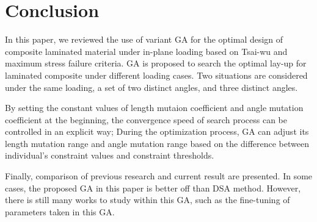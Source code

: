 \section{Conclusion}
In this paper, we reviewed the use of variant GA for the optimal design of composite
laminated material under in-plane loading based on Tsai-wu and maximum stress
failure criteria. GA is proposed to search the optimal lay-up for laminated
composite under different loading cases. Two situations are considered under the same
loading, a set of two distinct angles, and three distinct angles. 

By setting the constant values of length mutaion coefficient and angle mutation
coefficient at the beginning, the convergence speed of search process can be
controlled in an explicit way; During the optimization process, GA can adjust
its length mutation range and angle mutation range based on the difference
between individual's constraint values and constraint thresholds.  

Finally, comparison of previous research and current result are presented. In
some cases, the proposed GA in this paper is better off than DSA method.
However, there is still many works to study within this GA, such as the
fine-tuning of parameters taken in this GA.



